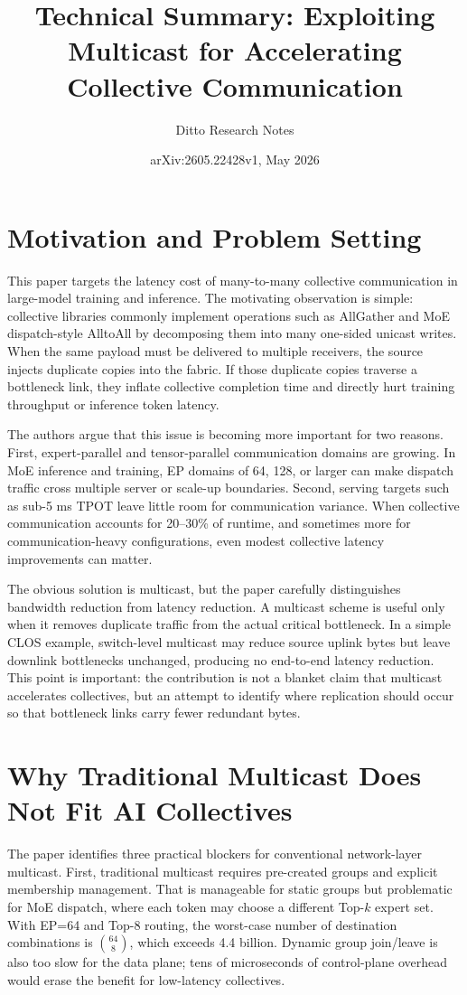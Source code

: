 \documentclass[10pt]{article}
\title{Technical Summary: Exploiting Multicast for Accelerating Collective Communication}
\author{Ditto Research Notes}
\date{arXiv:2605.22428v1, May 2026}
\begin{document}
\maketitle

\section{Motivation and Problem Setting}

This paper targets the latency cost of many-to-many collective communication in large-model training and inference. The motivating observation is simple: collective libraries commonly implement operations such as AllGather and MoE dispatch-style AlltoAll by decomposing them into many one-sided unicast writes. When the same payload must be delivered to multiple receivers, the source injects duplicate copies into the fabric. If those duplicate copies traverse a bottleneck link, they inflate collective completion time and directly hurt training throughput or inference token latency.

The authors argue that this issue is becoming more important for two reasons. First, expert-parallel and tensor-parallel communication domains are growing. In MoE inference and training, EP domains of 64, 128, or larger can make dispatch traffic cross multiple server or scale-up boundaries. Second, serving targets such as sub-5 ms TPOT leave little room for communication variance. When collective communication accounts for 20--30\% of runtime, and sometimes more for communication-heavy configurations, even modest collective latency improvements can matter.

The obvious solution is multicast, but the paper carefully distinguishes bandwidth reduction from latency reduction. A multicast scheme is useful only when it removes duplicate traffic from the actual critical bottleneck. In a simple CLOS example, switch-level multicast may reduce source uplink bytes but leave downlink bottlenecks unchanged, producing no end-to-end latency reduction. This point is important: the contribution is not a blanket claim that multicast accelerates collectives, but an attempt to identify where replication should occur so that bottleneck links carry fewer redundant bytes.

\section{Why Traditional Multicast Does Not Fit AI Collectives}

The paper identifies three practical blockers for conventional network-layer multicast. First, traditional multicast requires pre-created groups and explicit membership management. That is manageable for static groups but problematic for MoE dispatch, where each token may choose a different Top-\(k\) expert set. With EP=64 and Top-8 routing, the worst-case number of destination combinations is \(\binom{64}{8}\), which exceeds 4.4 billion. Dynamic group join/leave is also too slow for the data plane; tens of microseconds of control-plane overhead would erase the benefit for low-latency collectives.
\end{document}
